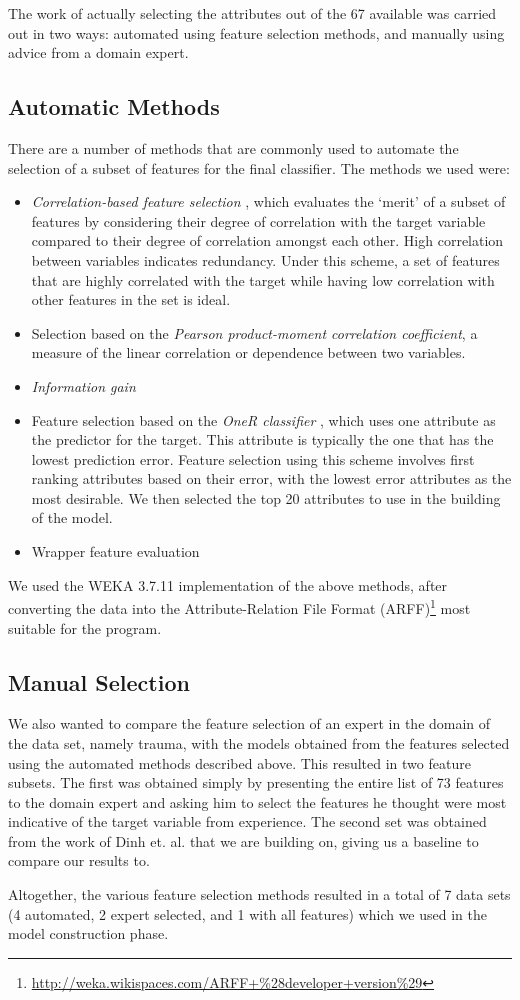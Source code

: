 The work of actually selecting the attributes out of the 67 available was
carried out in two ways: automated using feature selection methods, and
manually using advice from a domain expert.

\subsection{Automatic Methods}
There are a number of methods that are commonly used to automate the selection
of a subset of features for the final classifier. The methods we used were:
\begin{itemize}
  \item \textit{Correlation-based feature selection} \citep{Hall2000},
  which evaluates the `merit' of a
  subset of features by considering their degree of correlation with the target
  variable compared to their degree of correlation amongst each other. High
  correlation between variables indicates redundancy. Under
  this scheme, a set of features that are highly correlated with the target
  while having low correlation with other features in the set is ideal.
  \item Selection based on the
  \textit{Pearson product-moment correlation coefficient}, a measure of the
  linear correlation or dependence between two variables.
  \item \textit{Information gain} 
  \item Feature selection based on the \textit{OneR classifier}
  \citep{Holte1993}, which uses one
  attribute as the predictor for the target. This attribute is typically the one
  that has the lowest prediction error. Feature selection using this scheme
  involves first ranking attributes based on their error, with the lowest error
  attributes as the most desirable. We then selected the top 20 attributes to
  use in the building of the model.
  \item Wrapper feature evaluation 
\end{itemize}

We used the WEKA 3.7.11 \citep{Hall2009} implementation of the above
methods, after converting the data into the Attribute-Relation File Format
(ARFF)\footnote{\url{http://weka.wikispaces.com/ARFF+\%28developer+version\%29}}
most suitable for the program.

\subsection{Manual Selection}
We also wanted to compare the feature selection of an expert in the domain
of the data set, namely trauma, with the models obtained from the features
selected using the automated methods described above. This resulted in two
feature subsets. The first was obtained simply by presenting the entire list
of 73 features to the domain expert and asking him to select the features he
thought were most indicative of the target variable from experience. The
second set was obtained from the work of Dinh et. al. \citep{Dinh2013a} that
we are building on, giving us a baseline to compare our results to.

Altogether, the various feature selection methods resulted in a total of
7 data sets (4 automated, 2 expert selected, and 1 with all features) which
we used in the model construction phase.

